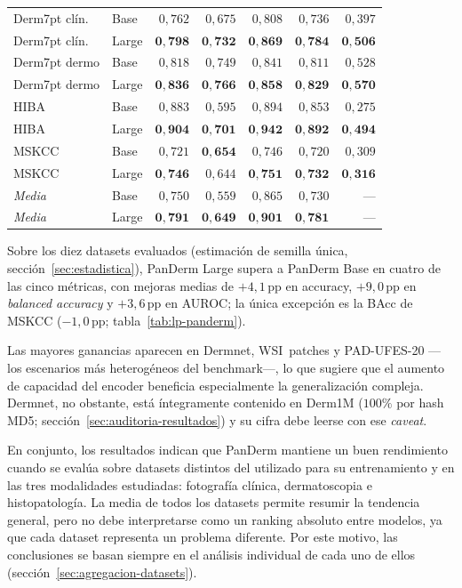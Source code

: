 \begin{table}[htbp]
\begin{tabular}{llrrrrr}
Derm7pt clín. & Base   & $0{,}762$      & $0{,}675$      & $0{,}808$      & $0{,}736$      & $0{,}397$ \\
Derm7pt clín. & Large  & $\mathbf{0{,}798}$ & $\mathbf{0{,}732}$ & $\mathbf{0{,}869}$ & $\mathbf{0{,}784}$ & $\mathbf{0{,}506}$ \\
Derm7pt dermo & Base   & $0{,}818$      & $0{,}749$      & $0{,}841$      & $0{,}811$      & $0{,}528$ \\
Derm7pt dermo & Large  & $\mathbf{0{,}836}$ & $\mathbf{0{,}766}$ & $\mathbf{0{,}858}$ & $\mathbf{0{,}829}$ & $\mathbf{0{,}570}$ \\
HIBA          & Base   & $0{,}883$      & $0{,}595$      & $0{,}894$      & $0{,}853$      & $0{,}275$ \\
HIBA          & Large  & $\mathbf{0{,}904}$ & $\mathbf{0{,}701}$ & $\mathbf{0{,}942}$ & $\mathbf{0{,}892}$ & $\mathbf{0{,}494}$ \\
MSKCC         & Base   & $0{,}721$      & $\mathbf{0{,}654}$ & $0{,}746$      & $0{,}720$      & $0{,}309$ \\
MSKCC         & Large  & $\mathbf{0{,}746}$ & $0{,}644$      & $\mathbf{0{,}751}$ & $\mathbf{0{,}732}$ & $\mathbf{0{,}316}$ \\
\hline
\emph{Media}  & Base   & $0{,}750$      & $0{,}559$      & $0{,}865$      & $0{,}730$      & --- \\
\emph{Media}  & Large  & $\mathbf{0{,}791}$ & $\mathbf{0{,}649}$ & $\mathbf{0{,}901}$ & $\mathbf{0{,}781}$ & --- \\
\hline
\end{tabular}
\end{table}

Sobre los diez datasets evaluados (estimación de semilla única,
sección~\ref{sec:estadistica}), PanDerm Large supera a PanDerm Base en
cuatro de las cinco métricas, con mejoras medias de $+4{,}1$\,pp en
accuracy, $+9{,}0$\,pp en \emph{balanced accuracy} y $+3{,}6$\,pp en
AUROC; la única excepción es la BAcc de MSKCC ($-1{,}0$\,pp;
tabla~\ref{tab:lp-panderm}).

Las mayores ganancias aparecen en Dermnet, WSI~patches y PAD-UFES-20
---los escenarios más heterogéneos del benchmark---, lo que sugiere
que el aumento de capacidad del encoder beneficia especialmente la
generalización compleja. Dermnet, no obstante, está íntegramente
contenido en Derm1M ($100\%$ por hash MD5;
sección~\ref{sec:auditoria-resultados}) y su cifra debe leerse con ese
\emph{caveat}.

En conjunto, los resultados indican que PanDerm mantiene un buen
rendimiento cuando se evalúa sobre datasets distintos del utilizado
para su entrenamiento y en las tres modalidades estudiadas: fotografía
clínica, dermatoscopia e histopatología. La media de todos los datasets
permite resumir la tendencia general, pero no debe interpretarse como
un ranking absoluto entre modelos, ya que cada dataset representa un
problema diferente. Por este motivo, las conclusiones se basan siempre
en el análisis individual de cada uno de ellos
(sección~\ref{sec:agregacion-datasets}).

